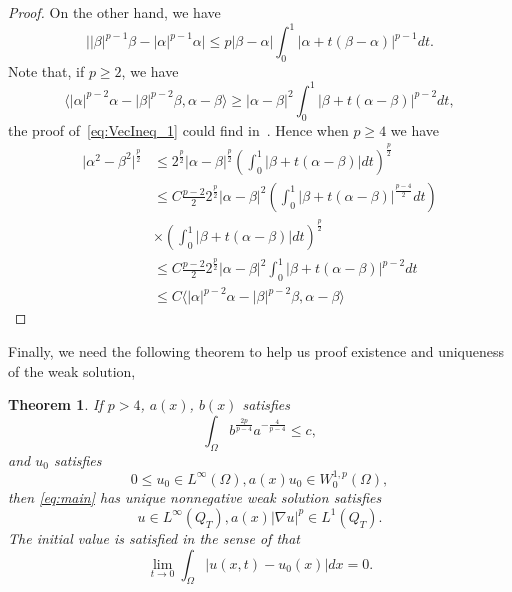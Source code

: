 \documentclass[11pt]{amsart}
\newtheorem{theorem}{Theorem}[section]
\theoremstyle{definition}
\numberwithin{equation}{section}
\newcommand*\abs[1]{\lvert#1\rvert}
\begin{document}
\begin{proof}
	On the other hand, we have
	\begin{equation}
		\abs{\abs{\beta}^{p-1}\beta - \abs{\alpha}^{p-1}\alpha} \leq p\abs{\beta-\alpha}\int_0^1 \abs{\alpha + t(\beta - \alpha)}^{p-1}dt.
	\end{equation}
	Note that, if $p \geq 2$, we have
	\begin{equation}\label{eq:VecIneq_1}
		\langle \abs{\alpha}^{p-2}\alpha - \abs{\beta}^{p-2}\beta, \alpha-\beta\rangle
		\geq \abs{\alpha-\beta}^2\int_0^1 \abs{\beta + t(\alpha - \beta)}^{p-2}dt,
	\end{equation}
	the proof of~\cref{eq:VecIneq_1} could find in~\cite{lindqvistNotesStationaryPLaplace2019}.
	Hence when $p \geq 4$ we have
	\begin{equation}
		\begin{split}
			\abs{\alpha^2 - \beta^2}^{\frac{p}{2}}
			&\leq 2^{\frac{p}{2}}\abs{\alpha-\beta}^{\frac{p}{2}}
			\left(\int_0^1 \abs{\beta + t(\alpha - \beta)}dt\right)^{\frac{p}{2}}\\
			&\leq C\frac{p-2}{2}2^{\frac{p}{2}}\abs{\alpha-\beta}^2
			\left(\int_0^1 \abs{\beta + t(\alpha - \beta)}^{\frac{p-4}{2}}dt\right)\\
			&\times\left(\int_0^1 \abs{\beta + t(\alpha - \beta)}dt\right)^{\frac{p}{2}}\\
			&\leq C\frac{p-2}{2}2^{\frac{p}{2}}\abs{\alpha-\beta}^2
			\int_0^1 \abs{\beta + t(\alpha - \beta)}^{p-2}dt\\
			&\leq C \langle \abs{\alpha}^{p-2}\alpha - \abs{\beta}^{p-2}\beta, \alpha-\beta\rangle
		\end{split}
	\end{equation}
\end{proof}

Finally, we need the following theorem to help us proof existence and uniqueness of the weak solution,
\begin{theorem}\cite[thm 1.3 and 1.6]{Zhan2019Uniquenessa}\label{thm:zhan}
	If $p>4$, $a(x)$, $b(x)$ satisfies
	\begin{equation}
		\int_{\Omega} b^{\frac{2p}{p-4}}a^{-\frac{4}{p-4}} \leq c,
	\end{equation}
	and $u_0$ satisfies
	\begin{equation}
		0 \leq u_0 \in L^{\infty}(\Omega), a(x)u_0 \in W_0^{1,p}(\Omega),
	\end{equation}
	then \cref{eq:main} has unique nonnegative weak solution satisfies
	\begin{equation}
		u \in L^{\infty}(Q_T), a(x)\abs{\nabla u}^p \in L^1(Q_T).
	\end{equation}
	The initial value is satisfied in the sense of that
	\begin{equation}
		\lim_{t \to 0}\int_{\Omega}\abs{u(x,t) - u_0(x)}dx = 0.
	\end{equation}
\end{theorem}
\end{document}
